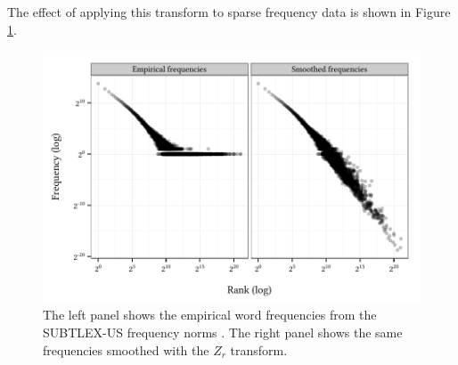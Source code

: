 \noindent The effect of applying this transform to sparse frequency data is shown in Figure \ref{subtlex}.

\begin{figure}
\centering
\includegraphics{zr.pdf}
\caption{The left panel shows the empirical word frequencies from the SUBTLEX-US frequency norms \citep{Brysbaert2009}. The right panel shows the same frequencies smoothed with the $Z_r$ transform.}
\label{subtlex}
\end{figure}
